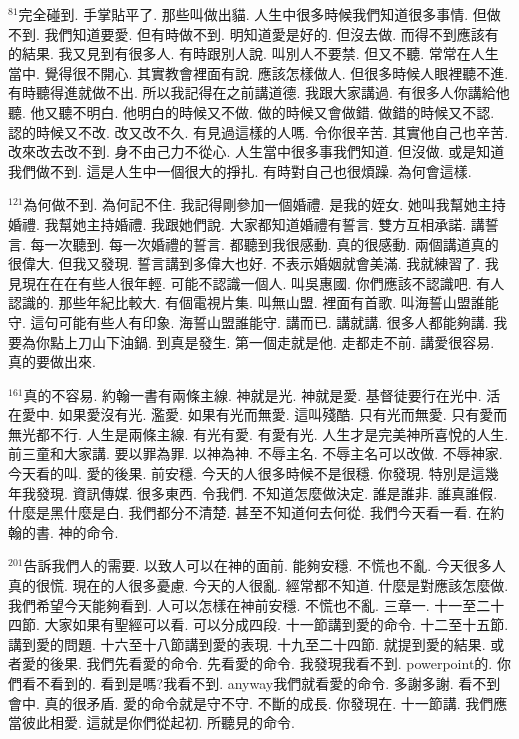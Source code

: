 \documentclass{book}
\begin{document}
$^{81}$完全碰到.
手掌貼平了.
那些叫做出貓.
人生中很多時候我們知道很多事情.
但做不到.
我們知道要愛.
但有時做不到.
明知道愛是好的.
但沒去做.
而得不到應該有的結果.
我又見到有很多人.
有時跟別人說.
叫別人不要禁.
但又不聽.
常常在人生當中.
覺得很不開心.
其實教會裡面有說.
應該怎樣做人.
但很多時候人眼裡聽不進.
有時聽得進就做不出.
所以我記得在之前講道德.
我跟大家講過.
有很多人你講給他聽.
他又聽不明白.
他明白的時候又不做.
做的時候又會做錯.
做錯的時候又不認.
認的時候又不改.
改又改不久.
有見過這樣的人嗎.
令你很辛苦.
其實他自己也辛苦.
改來改去改不到.
身不由己力不從心.
人生當中很多事我們知道.
但沒做.
或是知道我們做不到.
這是人生中一個很大的掙扎.
有時對自己也很煩躁.
為何會這樣.

$^{121}$為何做不到.
為何記不住.
我記得剛參加一個婚禮.
是我的姪女.
她叫我幫她主持婚禮.
我幫她主持婚禮.
我跟她們說.
大家都知道婚禮有誓言.
雙方互相承諾.
講誓言.
每一次聽到.
每一次婚禮的誓言.
都聽到我很感動.
真的很感動.
兩個講道真的很偉大.
但我又發現.
誓言講到多偉大也好.
不表示婚姻就會美滿.
我就練習了.
我見現在在在有些人很年輕.
可能不認識一個人.
叫吳惠國.
你們應該不認識吧.
有人認識的.
那些年紀比較大.
有個電視片集.
叫無山盟.
裡面有首歌.
叫海誓山盟誰能守.
這句可能有些人有印象.
海誓山盟誰能守.
講而已.
講就講.
很多人都能夠講.
我要為你點上刀山下油鍋.
到真是發生.
第一個走就是他.
走都走不前.
講愛很容易.
真的要做出來.

$^{161}$真的不容易.
約翰一書有兩條主線.
神就是光.
神就是愛.
基督徒要行在光中.
活在愛中.
如果愛沒有光.
濫愛.
如果有光而無愛.
這叫殘酷.
只有光而無愛.
只有愛而無光都不行.
人生是兩條主線.
有光有愛.
有愛有光.
人生才是完美神所喜悅的人生.
前三童和大家講.
要以罪為罪.
以神為神.
不辱主名.
不辱主名可以改做.
不辱神家.
今天看的叫.
愛的後果.
前安穩.
今天的人很多時候不是很穩.
你發現.
特別是這幾年我發現.
資訊傳媒.
很多東西.
令我們.
不知道怎麼做決定.
誰是誰非.
誰真誰假.
什麼是黑什麼是白.
我們都分不清楚.
甚至不知道何去何從.
我們今天看一看.
在約翰的書.
神的命令.

$^{201}$告訴我們人的需要.
以致人可以在神的面前.
能夠安穩.
不慌也不亂.
今天很多人真的很慌.
現在的人很多憂慮.
今天的人很亂.
經常都不知道.
什麼是對應該怎麼做.
我們希望今天能夠看到.
人可以怎樣在神前安穩.
不慌也不亂.
三章一.
十一至二十四節.
大家如果有聖經可以看.
可以分成四段.
十一節講到愛的命令.
十二至十五節.
講到愛的問題.
十六至十八節講到愛的表現.
十九至二十四節.
就提到愛的結果.
或者愛的後果.
我們先看愛的命令.
先看愛的命令.
我發現我看不到.
powerpoint的.
你們看不看到的.
看到是嗎?我看不到.
anyway我們就看愛的命令.
多謝多謝.
看不到會中.
真的很矛盾.
愛的命令就是守不守.
不斷的成長.
你發現在.
十一節講.
我們應當彼此相愛.
這就是你們從起初.
所聽見的命令.
\end{document}
